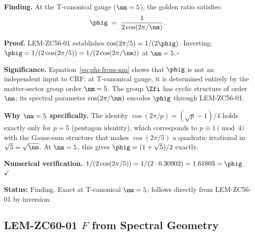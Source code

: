 \documentclass[12pt, a4paper]{article}
\begin{document}
\begin{derivedbox}[title={FIND-ZC60-01: $\phig = 1/(2\cos(2\pi/\nm))$
  at T-canonical --- $\phig$ from $\nm$ alone ($R_0$, Exact)}]
\textbf{Finding.}
At the T-canonical gauge ($\nm=5$), the golden ratio satisfies:
\begin{equation}\label{eq:phi-from-nm}
  \phig \;=\; \frac{1}{2\cos(2\pi/\nm)}.
\end{equation}

\textbf{Proof.}
LEM-ZC56-01 establishes $\cos(2\pi/5) = 1/(2\phig)$.
Inverting: $\phig = 1/(2\cos(2\pi/5)) = 1/(2\cos(2\pi/\nm))$
at $\nm=5$.\hfill$\square$

\textbf{Significance.}
Equation~\eqref{eq:phi-from-nm} shows that $\phig$ is not
an independent input to CRF: at T-canonical gauge, it is
determined entirely by the matter-sector group order $\nm=5$.
The group $\Zfi$ has cyclic structure of order $\nm$;
its spectral parameter $\cos(2\pi/\nm)$ encodes $\phig$
through LEM-ZC56-01.

\textbf{Why $\nm=5$ specifically.}
The identity $\cos(2\pi/p) = (\sqrt{p}-1)/4$ holds exactly
only for $p=5$ (pentagon identity), which corresponds to
$p\equiv 1\pmod{4}$ with the Gauss-sum structure that makes
$\cos(2\pi/5)$ a quadratic irrational in $\sqrt{5}=\sqrt{\nm}$.
At $\nm=5$, this gives $\phig=(1+\sqrt{5})/2$ exactly.

\textbf{Numerical verification.}
$1/(2\cos(2\pi/5)) = 1/(2\cdot0.30902) = 1.61803 = \phig$. $\checkmark$

\textbf{Status:} Finding.  Exact at T-canonical $\nm=5$;
follows directly from LEM-ZC56-01 by inversion.
\end{derivedbox}

\subsection{LEM-ZC60-01 \quad $F$ from Spectral Geometry}
\label{sec:lem01}

\end{document}
